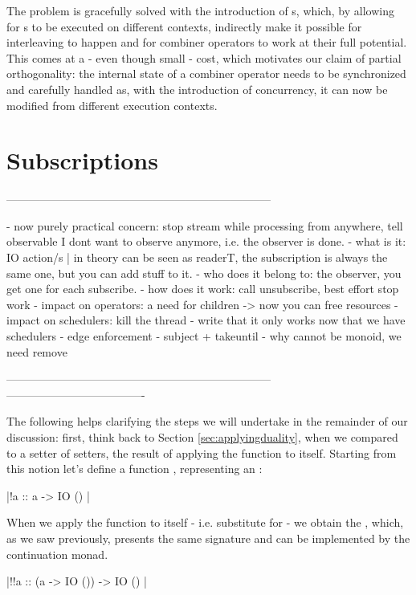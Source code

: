 The problem is gracefully solved with the introduction of s, which, by allowing for s to be executed on different contexts, indirectly make it possible for interleaving to happen and for combiner operators to work at their full potential. This comes at a - even though small - cost, which motivates our claim of partial orthogonality: the internal state of a combiner operator needs to be synchronized and carefully handled as, with the introduction of concurrency, it can now be modified from different execution contexts.


\section{Subscriptions}
\label{sec:subscriptions}

-----------------------------------------------------------------------

- now purely practical concern: stop stream while processing from anywhere, tell observable I dont want to observe anymore, i.e. the observer is done.
- what is it: IO action/s | in theory can be seen as readerT, the subscription is always the same one, but you can add stuff to it. 
- who does it belong to: the observer, you get one for each subscribe.
- how does it work: call unsubscribe, best effort stop work
- impact on operators: a need for children -> now you can free resources 
- impact on schedulers: kill the thread
- write that it only works now that we have schedulers
- edge enforcement
- subject + takeuntil
- why cannot be monoid, we need remove

-----------------------------------------------------------------------
-------------------------------------

The following helps clarifying the steps we will undertake in the remainder of our discussion: first, think back to Section \ref{sec:applyingduality}, when we compared  to a setter of setters, the result of applying the  function to itself. Starting from this notion let's define a function \code{(!)}, representing an :

\hmint |!a :: a -> IO () |

When we apply the function to itself - i.e. substitute  for  - we obtain the , which, as we saw previously, presents the same signature and can be implemented by the continuation monad.

\hmint |!!a :: (a -> IO ()) -> IO () |

